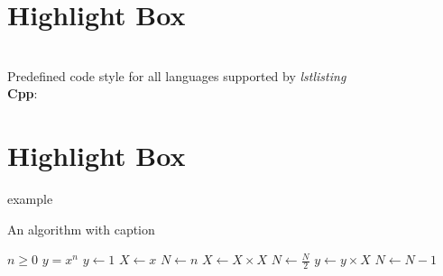 \documentclass{assignment}
\begin{document}

\section*{Highlight Box}\\
Predefined code style for all languages supported by \textit{lstlisting}\\
\textbf{Cpp}:



\section*{Highlight Box}

 example
\begin{algorithm}
\caption{An algorithm with caption}\label{alg:cap}
\begin{algorithmic}
\Require $n \geq 0$
\Ensure $y = x^n$
\State $y \gets 1$
\State $X \gets x$
\State $N \gets n$
    \State $X \gets X \times X$
    \State $N \gets \frac{N}{2}$  
    \State $y \gets y \times X$
    \State $N \gets N - 1$
\EndIf
\EndWhile
\end{algorithmic}
\end{algorithm}
\end{document}

